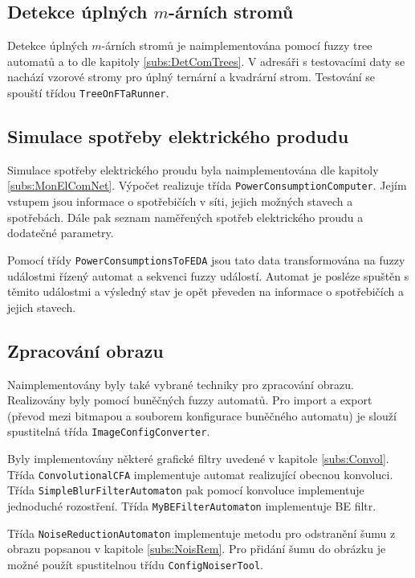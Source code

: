 \subsection{Detekce úplných $m$-árních stromů}
Detekce úplných $m$-árních stromů je naimplementována pomocí fuzzy tree automatů a to dle kapitoly \ref{subs:DetComTrees}. V adresáři s testovacími daty se nachází vzorové stromy pro úplný ternární a kvadrární strom. Testování se spouští třídou \verb|TreeOnFTaRunner|.

\subsection{Simulace spotřeby elektrického produdu}
Simulace spotřeby elektrického proudu byla naimplementována dle kapitoly \ref{subs:MonElComNet}. Výpočet realizuje třída \verb|PowerConsumptionComputer|. Jejím vstupem jsou informace o spotřebičích v síti, jejich možných stavech a spotřebách. Dále pak seznam naměřených spotřeb elektrického proudu a dodatečné parametry. 

Pomocí třídy \verb|PowerConsumptionsToFEDA| jsou tato data transformována na fuzzy událostmi řízený automat a sekvenci fuzzy událostí. Automat je posléze spuštěn s těmito událostmi a výsledný stav je opět převeden na informace o spotřebičích a jejich stavech. 

\subsection{Zpracování obrazu}
Naimplementovány byly také vybrané techniky pro zpracování obrazu. Realizovány byly pomocí buněčných fuzzy automatů. Pro import a export (převod mezi bitmapou a souborem konfigurace buněčného automatu) je slouží spustitelná třída \verb|ImageConfigConverter|.

Byly implementovány některé grafické filtry uvedené v kapitole \ref{subs:Convol}. Třída \verb|ConvolutionalCFA| implementuje automat realizující obecnou konvoluci. Třída \verb|SimpleBlurFilterAutomaton| pak pomocí konvoluce implementuje jednoduché rozostření. Třída \verb|MyBEFilterAutomaton| implementuje BE filtr. 

Třída \verb|NoiseReductionAutomaton| implementuje metodu pro odstranění šumu z obrazu popsanou v kapitole \ref{subs:NoisRem}. Pro přidání šumu do obrázku je možné použít spustitelnou třídu \verb|ConfigNoiserTool|. 

